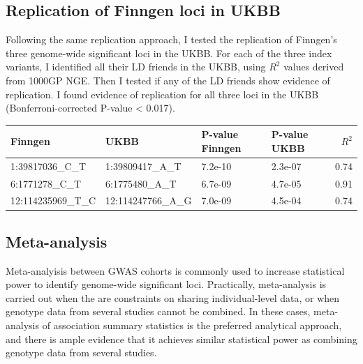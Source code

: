   \subsection{Replication of Finngen loci in UKBB}
  Following the same replication approach, I tested the replication of Finngen's three genome-wide significant loci in the UKBB. For each of the three index variants, I identified all their LD friends in the UKBB, using $R^{2}$ values derived from 1000GP NGE. Then I tested if any of the LD friends show evidence of replication. I found evidence of replication for all three loci in the UKBB (Bonferroni-corrected P-value < 0.017).

  \begin{table}[H]
    \centering
    \begin{tabular}[t]{llllr}
    \toprule
    Finngen & UKBB & P-value Finngen & P-value UKBB & $R^{2}$\\
    \midrule
    1:39817036\_C\_T & 1:39809417\_A\_T & 7.2e-10 & 2.3e-07 & 0.74\\
    6:1771278\_C\_T & 6:1775480\_A\_T & 6.7e-09 & 4.7e-05 & 0.91\\
    12:114235969\_T\_C & 12:114247766\_A\_G & 7.0e-09 & 4.5e-04 & 0.74\\
    \bottomrule
    \end{tabular}
    \end{table}


    \subsection{Meta-analysis}
    Meta-analyisis between GWAS cohorts is commonly used to increase statistical power to identify genome-wide significant loci. Practically, meta-analysis is carried out when the are constraints on sharing individual-level data, or when genotype data from several studies cannot be combined. In these cases, meta-analysis of association summary statistics is the preferred analytical approach, and there is ample evidence that it achieves similar statistical power as combining genotype data from several studies. 

